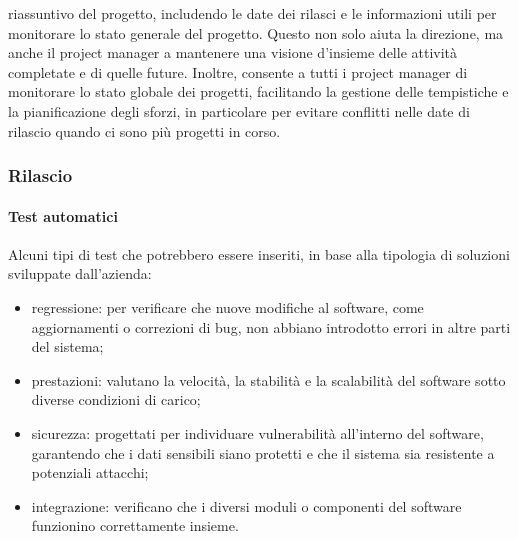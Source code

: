 \begin{itemize}
\begin{itemize}
                    riassuntivo del progetto, includendo le date dei rilasci e le informazioni utili per monitorare lo stato
                    generale del progetto. Questo non solo aiuta la direzione, ma anche il project manager a mantenere una visione
                    d'insieme delle attività completate e di quelle future. Inoltre, consente a tutti i project manager di monitorare
                    lo stato globale dei progetti, facilitando la gestione delle tempistiche e la pianificazione degli sforzi, in
                    particolare per evitare conflitti nelle date di rilascio quando ci sono più progetti in corso.
                \end{itemize}
            \end{itemize}
        
        \subsubsection{Rilascio}
            \paragraph{Test automatici}
            Alcuni tipi di test che potrebbero essere inseriti, in base alla tipologia di soluzioni sviluppate dall’azienda:
            \begin{itemize}
                \item regressione: per verificare che nuove modifiche al software, come aggiornamenti o correzioni di bug, non abbiano
                introdotto errori in altre parti del sistema;
                \item prestazioni: valutano la velocità, la stabilità e la scalabilità del software sotto diverse condizioni di carico;
                \item sicurezza: progettati per individuare vulnerabilità all’interno del software, garantendo che i dati sensibili siano
                protetti e che il sistema sia resistente a potenziali attacchi;
                \item integrazione: verificano che i diversi moduli o componenti del software funzionino correttamente insieme.
            \end{itemize}
            
